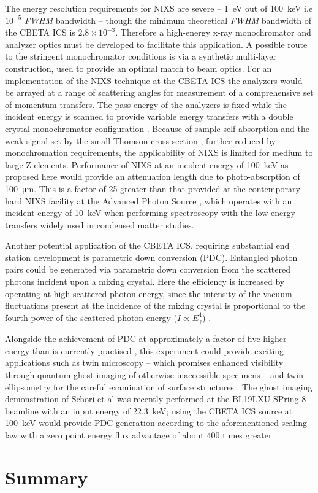 \documentclass[../main.tex]{subfiles}
\begin{document}
The energy resolution requirements for NIXS are severe -- 1~\si{\electronvolt} out of 100~\si{\kilo\electronvolt} i.e $10^{-5}$ \textit{FWHM} bandwidth -- though the minimum theoretical \textit{FWHM} bandwidth of the CBETA ICS is $2.8\times 10^{-3}$. Therefore a high-energy x-ray monochromator and analyzer optics must be developed to facilitate this application. A possible route to the stringent monochromator conditions is via a synthetic multi-layer construction, used to provide an optimal match to beam optics. For an implementation of the NIXS technique at the CBETA ICS the analyzers would be arrayed at a range of scattering angles for measurement of a comprehensive set of momentum transfers. The pass energy of the analyzers is fixed while the incident energy is scanned to provide variable energy transfers with a double crystal monochromator configuration \cite{schulke2007electron,fister2006multielement}. Because of sample self absorption and the weak signal set by the small Thomson cross section \cite{schulke2007electron}, further reduced by monochromation requirements, the applicability of NIXS is limited for medium to large Z elements. Performance of NIXS at an incident energy of 100~\si{\kilo\electronvolt} as proposed here would provide an attenuation length due to photo-absorption of 100~\si{\micro\meter}. This is a factor of 25 greater \cite{TungstenGraph} than that provided at the contemporary hard NIXS facility at the Advanced Photon Source \cite{fister2006multielement}, which operates with an incident energy of 10~\si{\kilo\electronvolt} when performing spectroscopy with the low energy transfers widely used in condensed matter studies.  

Another potential application of the CBETA ICS, requiring substantial end station development is parametric down conversion (PDC).  Entangled photon pairs could be generated via parametric down conversion from the scattered photons incident upon a mixing crystal. Here the efficiency is increased by operating at high scattered photon energy, since the intensity of the vacuum fluctuations present at the incidence of the mixing crystal is proportional to the fourth power of the scattered photon energy ($I \propto E_{\gamma}^{4}$) \cite{eisenberger1971x}.

Alongside the achievement of PDC at approximately a factor of five higher energy than is currently practised \cite{schori2018ghost}, this experiment could provide exciting applications such as twin microscopy -- which promises enhanced visibility through quantum ghost imaging of otherwise inaccessible specimens -- and twin ellipsometry for the careful examination of surface structures \cite{simon2017quantum}. The ghost imaging demonstration of Schori et al \cite{schori2018ghost} was recently performed at the BL19LXU SPring-8 beamline \cite{yabashi2001design} with an input energy of 22.3~\si{\kilo\electronvolt}; using the CBETA ICS source at 100~\si{\kilo\electronvolt} would provide PDC generation according to the aforementioned scaling law with a zero point energy flux advantage of about 400 times greater.  

\section{Summary}
\end{document}
